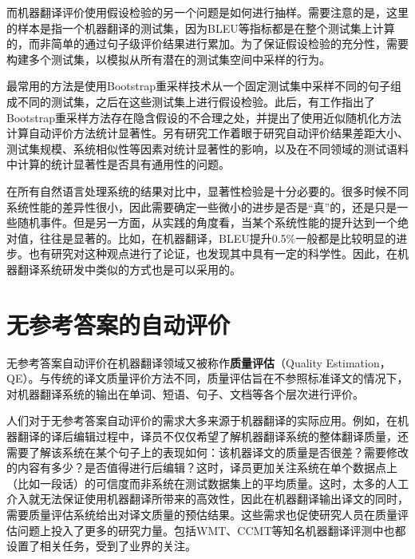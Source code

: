 \parinterval 而机器翻译评价使用假设检验的另一个问题是如何进行抽样。需要注意的是，这里的样本是指一个机器翻译的测试集，因为BLEU等指标都是在整个测试集上计算的，而非简单的通过句子级评价结果进行累加。为了保证假设检验的充分性，需要构建多个测试集，以模拟从所有潜在的测试集空间中采样的行为。

\parinterval 最常用的方法是使用Bootstrap重采样技术从一个固定测试集中采样不同的句子组成不同的测试集，之后在这些测试集上进行假设检验。此后，有工作指出了Bootstrap重采样方法存在隐含假设的不合理之处，并提出了使用近似随机化方法计算自动评价方法统计显著性。另有研究工作着眼于研究自动评价结果差距大小、测试集规模、系统相似性等因素对统计显著性的影响，以及在不同领域的测试语料中计算的统计显著性是否具有通用性的问题。

\parinterval 在所有自然语言处理系统的结果对比中，显著性检验是十分必要的。很多时候不同系统性能的差异性很小，因此需要确定一些微小的进步是否是“真”的，还是只是一些随机事件。但是另一方面，从实践的角度看，当某个系统性能的提升达到一个绝对值，往往是显著的。比如，在机器翻译，BLEU提升0.5$\%$一般都是比较明显的进步。也有研究对这种观点进行了论证，也发现其中具有一定的科学性。因此，在机器翻译系统研发中类似的方式也是可以采用的。


\sectionnewpage
\section{无参考答案的自动评价}

\parinterval 无参考答案自动评价在机器翻译领域又被称作{\small\sffamily\bfseries{质量评估}}（Quality Estimation，\\QE）。与传统的译文质量评价方法不同，质量评估旨在不参照标准译文的情况下，对机器翻译系统的输出在单词、短语、句子、文档等各个层次进行评价。

\parinterval 人们对于无参考答案自动评价的需求大多来源于机器翻译的实际应用。例如，在机器翻译的译后编辑过程中，译员不仅仅希望了解机器翻译系统的整体翻译质量，还需要了解该系统在某个句子上的表现如何：该机器译文的质量是否很差？需要修改的内容有多少？是否值得进行后编辑？这时，译员更加关注系统在单个数据点上（比如一段话）的可信度而非系统在测试数据集上的平均质量。这时，太多的人工介入就无法保证使用机器翻译所带来的高效性，因此在机器翻译输出译文的同时，需要质量评估系统给出对译文质量的预估结果。这些需求也促使研究人员在质量评估问题上投入了更多的研究力量。包括WMT、CCMT等知名机器翻译评测中也都设置了相关任务，受到了业界的关注。

